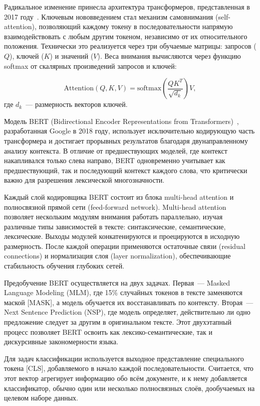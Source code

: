 \documentclass[master, och, coursework]{SCWorks1}
\begin{document}
Радикальное изменение принесла архитектура трансформеров, представленная в 2017 году~\cite{Vaswani2017}. Ключевым нововведением стал механизм самовнимания (self-attention), позволяющий каждому токену в последовательности напрямую взаимодействовать с любым другим токеном, независимо от их относительного положения. Технически это реализуется через три обучаемые матрицы: запросов (\(Q\)), ключей (\(K\)) и значений (\(V\)). Веса внимания вычисляются через функцию softmax от скалярных произведений запросов и ключей:

\begin{equation}
\text{Attention}(Q, K, V) = \text{softmax}\left(\frac{QK^T}{\sqrt{d_k}}\right) V,
\end{equation}
где \(d_k\)~--- размерность векторов ключей.

Модель BERT (Bidirectional Encoder Representations from Transformers)~\cite{Devlin2019}, разработанная Google в 2018 году, использует исключительно кодирующую часть трансформера и достигает прорывных результатов благодаря двунаправленному анализу контекста. В отличие от предшествующих моделей, где контекст накапливался только слева направо, BERT одновременно учитывает как предшествующий, так и последующий контекст каждого слова, что критически важно для разрешения лексической многозначности.

Каждый слой кодировщика BERT состоит из блока multi-head attention и полносвязной прямой сети (feed-forward network). Multi-head attention позволяет нескольким модулям внимания работать параллельно, изучая различные типы зависимостей в тексте: синтаксические, семантические, лексические. Выходы модулей конкатенируются и проецируются в исходную размерность. После каждой операции применяются остаточные связи (residual connections) и нормализация слоя (layer normalization), обеспечивающие стабильность обучения глубоких сетей.

Предобучение BERT осуществляется на двух задачах. Первая~--- Masked Language Modeling (MLM), где 15\% случайных токенов в тексте заменяются маской [MASK], а модель обучается их восстанавливать по контексту. Вторая~--- Next Sentence Prediction (NSP), где модель определяет, действительно ли одно предложение следует за другим в оригинальном тексте. Этот двухэтапный процесс позволяет BERT освоить как лексико-семантические, так и дискурсивные закономерности языка.

Для задач классификации используется выходное представление специального токена [CLS], добавляемого в начало каждой последовательности. Считается, что этот вектор агрегирует информацию обо всём документе, и к нему добавляется классификатор, обычно один или несколько полносвязных слоёв, дообучаемых на целевом наборе данных. 
\end{document}
